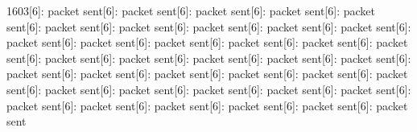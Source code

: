 \documentclass[parskip]{cs4rep}
\begin{document}
1603[6]: packet sent[6]: packet sent[6]: packet sent[6]: packet sent[6]: packet sent[6]: packet sent[6]: packet sent[6]: packet sent[6]: packet sent[6]: packet sent[6]: packet sent[6]: packet sent[6]: packet sent[6]: packet sent[6]: packet sent[6]: packet sent[6]: packet sent[6]: packet sent[6]: packet sent[6]: packet sent[6]: packet sent[6]: packet sent[6]: packet sent[6]: packet sent[6]: packet sent[6]: packet sent[6]: packet sent[6]: packet sent[6]: packet sent[6]: packet sent[6]: packet sent[6]: packet sent[6]: packet sent[6]: packet sent[6]: packet sent[6]: packet sent[6]: packet sent[6]: packet sent\newline
\end{document}
